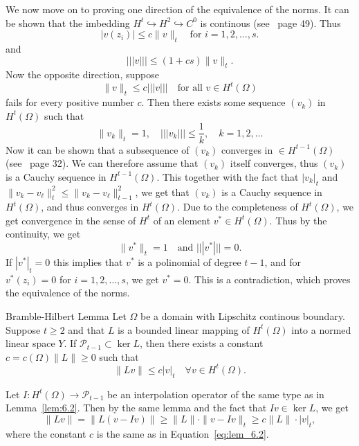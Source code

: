 \begin{bev}
We now move on to proving one direction of the equivalence of the norms. 
It can be shown that the imbedding $H^t\hookrightarrow H^2 \hookrightarrow C^0$ is continous (see~\cite{Braess} page 49). Thus
\begin{equation*}
    |v(z_i)|\leq c\|v\|_t\quad \text{for } i=1,2,\ldots,s.
\end{equation*} 
and
\begin{equation*}
    |||v|||\leq (1+cs)\|v\|_t.
\end{equation*}
Now the opposite direction, suppose 
\begin{equation*}
    \|v\|_t\leq c|||v|||\quad \text{for all } v\in H^t(\Omega)
\end{equation*}
fails for every positive number $c$. Then there exists some sequence $(v_k)$ in $H^t(\Omega)$ such that
\begin{equation*}
    \|v_k\|_t=1,\quad |||v_k|||\leq \frac{1}{k},\quad k=1,2,\ldots
\end{equation*}
Now it can be shown that a subsequence of $(v_k)$ converges in $\in H^{t-1}(\Omega)$ (see~\cite{Braess} page 32). We can therefore assume that $(v_k)$ itself converges, thus $(v_k)$ is a Cauchy sequence in $H^{t-1}(\Omega)$.
This together with the fact that $|v_k|_t$ and $\|v_k-v_\ell\|_t^2\leq\|v_k-v_\ell\|_{t-1}^2$, we get that $(v_k)$ is a Cauchy sequence in $H^t(\Omega)$, and thus converges in $H^t(\Omega)$.
Due to the completeness of $H^t(\Omega)$, we get convergence in the sense of $H^t$ of an element $v^*\in H^t(\Omega)$. 
Thus by the continuity, we get 
\begin{equation}
    \|v^*\|_t = 1\quad \text{and }|||v^*|||=0. 
\end{equation}
If $|v^*|_t = 0$ this implies that $v^*$ is a polinomial of degree $t-1$, and for $v^*(z_i)=0$ for $i=1,2,\ldots,s$, we get $v^*=0$. This is a contradiction, which proves the equivalence of the norms.
\end{bev}

\begin{lem}{Bramble-Hilbert Lemma}
    Let $\Omega$ be a domain with Lipschitz continous boundary. Suppose $t\geq 2$ and that $L$ is a bounded linear mapping of $H^t(\Omega)$ into a normed linear space $Y$.
    If $\mathcal{P}_{t-1}\subset \ker L$, then there exists a constant $c=c(\Omega)\|L\|\geq 0$ such that
    \begin{equation}
        \|Lv\|\leq c|v|_t\quad \forall v\in H^t(\Omega).
    \end{equation}\label{lem:Bramble-Hilbert}
\end{lem}
\begin{bev}
    Let $I:H^t(\Omega)\rightarrow \mathcal{P}_{t-1}$ be an interpolation operator of the same type as in Lemma~\ref{lem:6.2}. Then by the same lemma and the fact that $Iv\in\ker L$, we get
    \begin{equation}
        \|Lv\|=\|L(v-Iv)\|\geq \|L\|\cdot\|v-Iv\|_t\geq c\|L\| \cdot |v|_t,
    \end{equation}
    where the constant $c$  is the same as in Equation~\ref{eq:lem_6.2}.~\label{lem:6.3}
\end{bev}